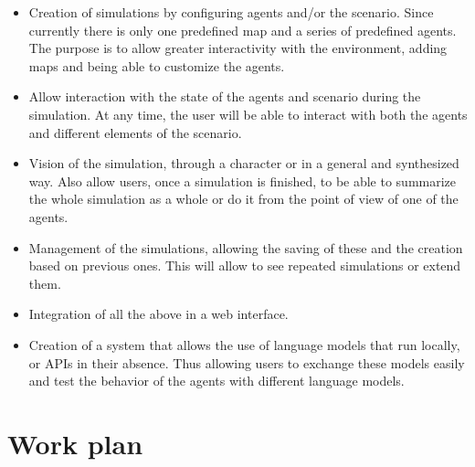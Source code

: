  \begin{itemize}
 	 \item Creation of simulations by configuring agents and/or the scenario. Since currently there is only one predefined map and a series of predefined agents. The purpose is to allow greater interactivity with the environment, adding maps and being able to customize the agents.
 	 
	\item Allow interaction with the state of the agents and scenario during the simulation. At any time, the user will be able to interact with both the agents and different elements of the scenario.
	
	\item Vision of the simulation, through a character or in a general and synthesized way. Also allow users, once a simulation is finished, to be able to summarize the whole simulation as a whole or do it from the point of view of one of the agents.
	
	\item Management of the simulations, allowing the saving of these and the creation based on previous ones. This will allow to see repeated simulations or extend them.
	
	\item Integration of all the above in a web interface.
	
	\item Creation of a system that allows the use of language models that run locally, or APIs in their absence. Thus allowing users to exchange these models easily and test the behavior of the agents with different language models. 
\end{itemize}

\section{Work plan}

